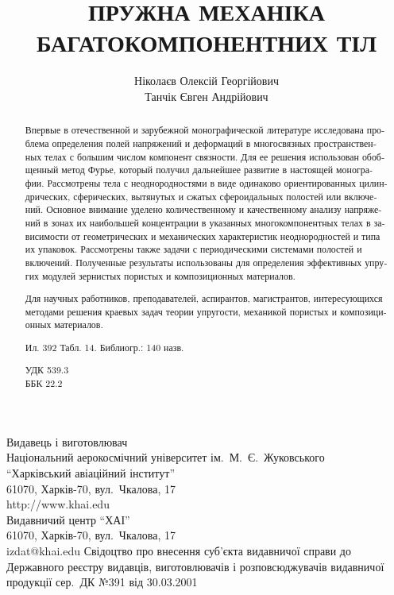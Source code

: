 \documentclass[book,14pt,small,twoside]{ncc}
\begin{document}
\begin{abstract}
\begin{russian}
\par Впервые в отечественной и зарубежной монографической литературе исследована проблема определения полей напряжений и деформаций в многосвязных пространственных телах с большим числом компонент связности. Для ее решения использован обобщенный метод Фурье, который получил дальнейшее развитие в настоящей монографии. Рассмотрены тела с неоднородностями в виде одинаково ориентированных цилиндрических, сферических, вытянутых и сжатых сфероидальных полостей или включений. Основное внимание уделено количественному и качественному анализу напряжений в зонах их наибольшей концентрации в указанных многокомпонентных телах в зависимости от геометрических и механических характеристик неоднородностей и типа их упаковок. Рассмотрены также задачи с периодическими системами полостей и включений. Полученные результаты использованы для определения эффективных упругих модулей зернистых пористых и композиционных материалов.

Для научных работников, преподавателей, аспирантов, магистрантов, интересующихся методами решения краевых задач теории упругости, механикой пористых и композиционных материалов.
\qef
\begin{minipage}[t]{0.85\linewidth}
Ил. 392 Табл. 14. Библиогр.: 140 назв.
\end{minipage}
\begin{minipage}[t]{0.15\linewidth}
УДК 539.3\\ ББК 22.2
\end{minipage}
\end{russian}
\end{abstract}
\author{Ніколаєв Олексій Георгійович \\ Танчік Євген Андрійович \vskip2cm}
\title{ПРУЖНА МЕХАНІКА БАГАТОКОМПОНЕНТНИХ ТІЛ}
{Видавець і виготовлювач \\
Національний аерокосмічний університет ім.~М.~Є.~Жуковського \\
``Харківський авіаційний інститут'' \\
61070, Харків-70, вул.~Чкалова, 17 \\
http://www.khai.edu \\
Видавничий центр ``ХАІ'' \\
61070, Харків-70, вул.~Чкалова, 17 \\
izdat@khai.edu}
{Свідоцтво про внесення суб'єкта видавничої справи до Державного реєстру видавців, виготовлювачів і розповсюджувачів видавничої продукції сер.~ДК №391 від 30.03.2001}
\end{document}
